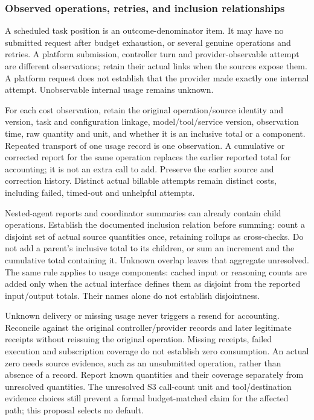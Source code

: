 \documentclass[
  english,
  11pt,
]{article}
\begin{document}
\subsubsection{Observed operations, retries, and inclusion
relationships}\label{observed-operations-retries-and-inclusion-relationships}

A scheduled task position is an outcome-denominator item. It may have no
submitted request after budget exhaustion, or several genuine operations
and retries. A platform submission, controller turn and
provider-observable attempt are different observations; retain their
actual links when the sources expose them. A platform request does not
establish that the provider made exactly one internal attempt.
Unobservable internal usage remains unknown.

For each cost observation, retain the original operation/source identity
and version, task and configuration linkage, model/tool/service version,
observation time, raw quantity and unit, and whether it is an inclusive
total or a component. Repeated transport of one usage record is one
observation. A cumulative or corrected report for the same operation
replaces the earlier reported total for accounting; it is not an extra
call to add. Preserve the earlier source and correction history.
Distinct actual billable attempts remain distinct costs, including
failed, timed-out and unhelpful attempts.

Nested-agent reports and coordinator summaries can already contain child
operations. Establish the documented inclusion relation before summing:
count a disjoint set of actual source quantities once, retaining rollups
as cross-checks. Do not add a parent's inclusive total to its children,
or sum an increment and the cumulative total containing it. Unknown
overlap leaves that aggregate unresolved. The same rule applies to usage
components: cached input or reasoning counts are added only when the
actual interface defines them as disjoint from the reported input/output
totals. Their names alone do not establish disjointness.

Unknown delivery or missing usage never triggers a resend for
accounting. Reconcile against the original controller/provider records
and later legitimate receipts without reissuing the original operation.
Missing receipts, failed execution and subscription coverage do not
establish zero consumption. An actual zero needs source evidence, such
as an unsubmitted operation, rather than absence of a record. Report
known quantities and their coverage separately from unresolved
quantities. The unresolved S3 call-count unit and tool/destination
evidence choices still prevent a formal budget-matched claim for the
affected path; this proposal selects no default.
\end{document}
